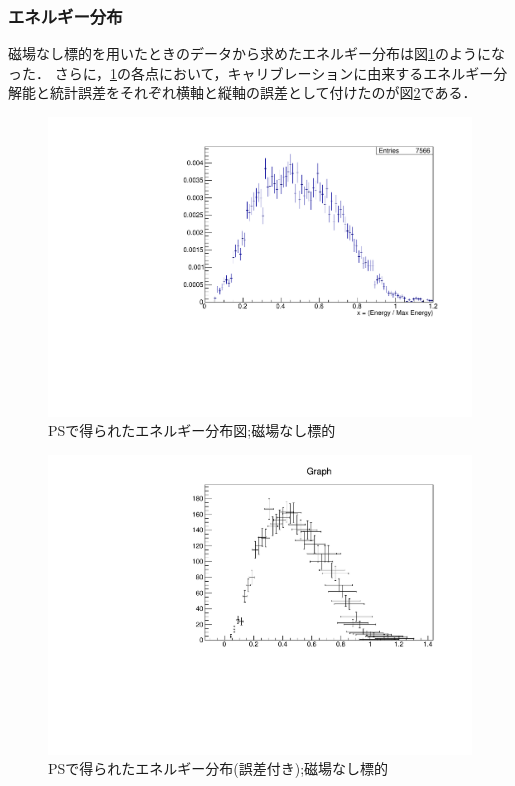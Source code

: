 \subsubsection{エネルギー分布}
磁場なし標的を用いたときのデータから求めたエネルギー分布は図\ref{michel_PS}のようになった．
さらに，\ref{michel_PS}の各点において，キャリブレーションに由来するエネルギー分解能と統計誤差をそれぞれ横軸と縦軸の誤差として付けたのが図\ref{michel_PS_gosa}である．%
\begin{figure}[H]
\centering
\includegraphics[height = 0.7\columnwidth , angle = -90]{figure/ikemitsu/michel_PS.pdf}
\caption{PSで得られたエネルギー分布図;磁場なし標的}
\label{michel_PS}
\end{figure}

\begin{figure}[H]
\centering
\includegraphics[height = 0.7\columnwidth , angle = -90]{figure/ikemitsu/michel_PS_gosa.pdf}
\caption{PSで得られたエネルギー分布(誤差付き);磁場なし標的}
\label{michel_PS_gosa}
\end{figure}

